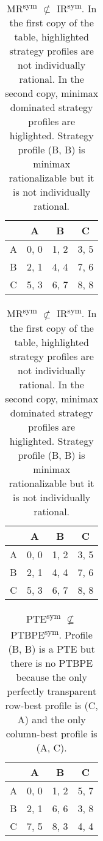 \begin{table}
	\caption{
		MR\textsuperscript{sym} $\not\subset$ IR\textsuperscript{sym}.
		In the first copy of the table, highlighted strategy profiles are not individually rational.
		In the second copy, minimax dominated strategy profiles are higlighted.
		Strategy profile (B, B) is minimax rationalizable but it is not individually rational.
	}
	\label{tab:mr-not-sub-ir}
	\centering
	\begin{tabular}{|c|c|c|c|}
		\hline
			& A		& B	   & C	  \\
		\hline
		A 		&\cellcolor{gray!70} 0, 0 &\cellcolor{gray!70} 1, 2 &\cellcolor{gray!70} 3, 5 \\
		\hline
		B		&\cellcolor{gray!70} 2, 1 &\cellcolor{gray!70} 4, 4 &\cellcolor{gray!00} 7, 6 \\
		\hline
		C		&\cellcolor{gray!70} 5, 3 &\cellcolor{gray!00} 6, 7 &\cellcolor{gray!00} 8, 8 \\
		\hline
	\end{tabular}
	\hspace{1em}
	\begin{tabular}{|c|c|c|c|}
		\hline
			& A		& B	   & C	  \\
		\hline
		A 		&\cellcolor{gray!70} 0, 0 &\cellcolor{gray!70} 1, 2 &\cellcolor{gray!70} 3, 5 \\
		\hline
		B		&\cellcolor{gray!70} 2, 1 &\cellcolor{gray!00} 4, 4 &\cellcolor{gray!00} 7, 6 \\
		\hline
		C		&\cellcolor{gray!70} 5, 3 &\cellcolor{gray!00} 6, 7 &\cellcolor{gray!00} 8, 8 \\
		\hline
	\end{tabular}
\end{table}

\begin{table}
	\caption{
		PTE\textsuperscript{sym} $\not\subseteq$ PTBPE\textsuperscript{sym}.
		Profile (B, B) is a PTE but there is no PTBPE because the only perfectly transparent row-best profile is (C, A) and the only column-best profile is (A, C).
	}
	\label{tab:pte-not-sub-ptbpe}
	\centering
	\begin{tabular}{|c|c|c|c|}
		\hline
			& A		& B	   & C	  \\
		\hline
		A 		&\cellcolor{gray!70} 0, 0 &\cellcolor{gray!70} 1, 2 &\cellcolor{gray!20} 5, 7 \\
		\hline
		B		&\cellcolor{gray!70} 2, 1 &\cellcolor{gray!00} 6, 6 &\cellcolor{gray!70} 3, 8 \\
		\hline
		C		&\cellcolor{gray!20} 7, 5 &\cellcolor{gray!20} 8, 3 &\cellcolor{gray!20} 4, 4 \\
		\hline
	\end{tabular}
\end{table}

